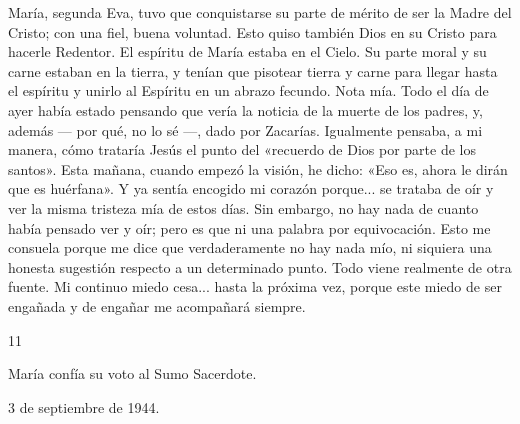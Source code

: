 \documentclass[12pt]{book} %
\begin{document}
María, segunda Eva, tuvo que conquistarse su parte de mérito de ser la Madre del Cristo; con una fiel, buena voluntad. Esto quiso también Dios en su Cristo para hacerle Redentor. 
El espíritu de María estaba en el Cielo. Su parte moral y su carne estaban en la tierra, y tenían que pisotear tierra y 
carne para llegar hasta el espíritu y unirlo al Espíritu en un abrazo fecundo. 
Nota mía. Todo el día de ayer había estado pensando que vería la noticia de la muerte de los padres, y, además — por qué, no lo sé —, dado por Zacarías. Igualmente pensaba, a mi manera, cómo trataría Jesús el punto del «recuerdo de Dios por parte de los santos». Esta mañana, cuando empezó la visión, he dicho: «Eso es, ahora le dirán que es huérfana». Y ya sentía encogido mi corazón porque... se trataba de oír y ver la misma tristeza mía de estos días. Sin embargo, no hay nada de cuanto había pensado ver y oír; pero es que ni una palabra por equivocación. Esto me consuela porque me dice que verdaderamente no hay nada mío, ni siquiera una honesta sugestión respecto a un determinado punto. Todo viene realmente de otra fuente. Mi continuo miedo cesa... hasta la próxima vez, porque este miedo de ser engañada y de engañar me acompañará siempre. 
 
 
 
 
 
 
 
 
11 
 
María confía su voto al Sumo Sacerdote. 
 
3 de septiembre de 1944. 
 
\end{document}
